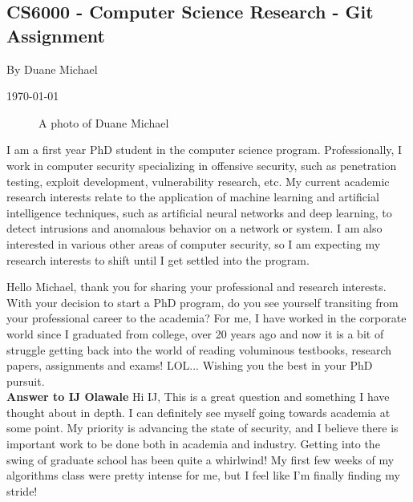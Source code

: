 \documentclass[11pt]{article}
\begin{document}
 
\begin{center}
    
    \section*{CS6000 - Computer Science Research - Git Assignment}
    By Duane Michael
    
    \today
\end{center}   
 

\begin{figure}[h]
    \centering
    \caption{A photo of Duane Michael}
    \label{fig:headshot}
\end{figure}
I am a first year PhD student in the computer science program. Professionally, I work in computer security specializing in offensive security, such as penetration testing, exploit development, vulnerability research, etc. My current academic research interests relate to the application of machine learning and artificial intelligence techniques, such as artificial neural networks and deep learning, to detect intrusions and anomalous behavior on a network or system. I am also interested in various other areas of computer security, so I am expecting my research interests to shift until I get settled into the program.

Hello Michael, thank you for sharing your professional and research interests. With your decision to start a PhD program, do you see yourself transiting from your professional career to the academia? For me, I have worked in the corporate world since I graduated from college, over 20 years ago and now it is a bit of struggle getting back into the world of reading voluminous testbooks, research papers, assignments and exams! LOL... Wishing you the best in your PhD pursuit.
\\

\textbf{Answer to IJ Olawale}
Hi IJ, This is a great question and something I have thought about in depth. I can definitely see myself going towards academia at some point. My priority is advancing the state of security, and I believe there is important work to be done both in academia and industry. Getting into the swing of graduate school has been quite a whirlwind! My first few weeks of my algorithms class were pretty intense for me, but I feel like I'm finally finding my stride!
\end{document}
